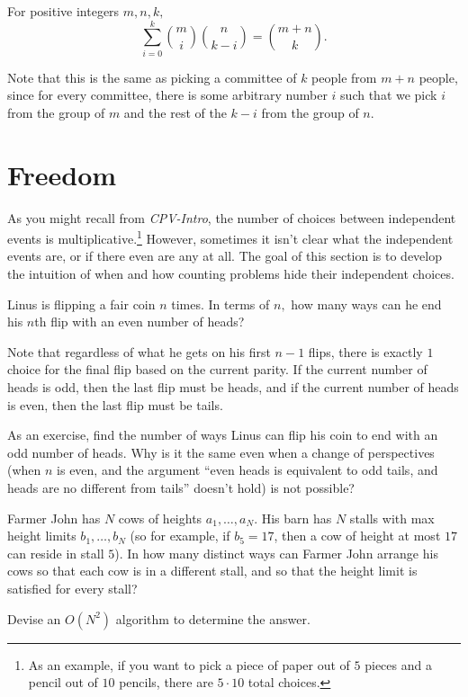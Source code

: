 \begin{theo}[Vandermonde]
For positive integers $m,n,k,$
\[\sum_{i=0}^k\binom {m}{i}\binom {n}{k-i}=\binom{m+n}{k}.\]
\end{theo}

\begin{pro}
Note that this is the same as picking a committee of $k$ people from $m+n$ people, since for every committee, there is some arbitrary number $i$ such that we pick $i$ from the group of $m$ and the rest of the $k-i$ from the group of $n.$
\end{pro}

\section{Freedom}

As you might recall from \emph{CPV-Intro}, the number of choices between independent events is multiplicative.\footnote{As an example, if you want to pick a piece of paper out of $5$ pieces and a pencil out of $10$ pencils, there are $5\cdot 10$ total choices.} However, sometimes it isn't clear what the independent events are, or if there even are any at all. The goal of this section is to develop the intuition of when and how counting problems hide their independent choices.

\begin{exam}[Coins]
Linus is flipping a fair coin $n$ times. In terms of $n,$ how many ways can he end his $n$th flip with an even number of heads?
\end{exam}

\begin{sol}
Note that regardless of what he gets on his first $n-1$ flips, there is exactly $1$ choice for the final flip based on the current parity. If the current number of heads is odd, then the last flip must be heads, and if the current number of heads is even, then the last flip must be tails.
\end{sol}

As an exercise, find the number of ways Linus can flip his coin to end with an odd number of heads. Why is it the same even when a change of perspectives (when $n$ is even, and the argument ``even heads is equivalent to odd tails, and heads are no different from tails'' doesn't hold) is not possible?

\begin{exam}
Farmer John has $N$ cows of heights $a_1,\ldots,a_N.$ His barn has $N$ stalls with max height limits $b_1,\ldots,b_N$ (so for example, if $b_5=17$, then a cow of height at most $17$ can reside in stall $5$). In how many distinct ways can Farmer John arrange his cows so that each cow is in a different stall, and so that the height limit is satisfied for every stall? 

Devise an $O(N^2)$ algorithm to determine the answer.
\end{exam}

